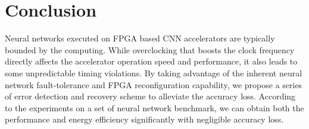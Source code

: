 \section{Conclusion} \label{sec:Conclusion}
Neural networks executed on FPGA based CNN accelerators 
are typically bounded by the computing. While overclocking 
that boosts the clock frequency 
directly affects the accelerator operation speed and performance, 
it also leads to some unpredictable timing violations. By taking 
advantage of the inherent neural network fault-tolerance 
and FPGA reconfiguration capability, we propose a series of 
error detection and recovery scheme to alleviate the accuracy 
loss. According to the experiments on 
a set of neural network benchmark, we can obtain both the 
performance and energy efficiency significantly with negligible 
accuracy loss.  



